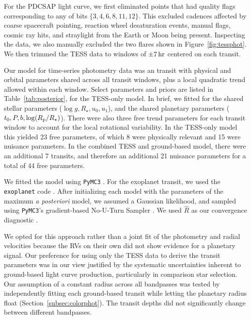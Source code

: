 \documentclass[12pt,twocolumn,tighten]{aastex63}
\begin{document}
For the PDCSAP light curve, we first eliminated points that had
quality flags corresponding to any of bits $\{3, 4, 6, 8, 11, 12\}$.
This excluded cadences affected by coarse spacecraft pointing,
reaction wheel desaturation events, manual flags, cosmic ray hits, and
straylight from the Earth or Moon being present.  Inspecting the data,
we also manually excluded the two flares shown in
Figure~\ref{fig:tessphot}.  We then trimmed the TESS data to windows
of $\pm 7\,{\rm hr}$ centered on each transit.

Our model for time-series photometry data was an
\citet{exoplanet:agol19} transit with physical and orbital parameters
shared across all transit windows, plus a local quadratic trend
allowed within each window.  Select parameters and priors are listed
in Table~\ref{tab:posterior}, for the TESS-only model.  In brief, we
fitted for the shared stellar parameters ($\log g, R_\star, u_0,
u_1$), and the shared planetary parameters ($t_0, P, b, \log(R_{\rm
p}/R_\star)$).  There were also three free trend parameters for each
transit window to account for the local rotational variability.  In
the TESS-only model this yielded 23 free parameters, of which 8 were
physically relevant and 15 were nuisance parameters.  In the combined
TESS and ground-based model, there were an additional 7 transits, and
therefore an additional 21 nuisance parameters for a total of 44 free
parameters.

We fitted the model using \texttt{PyMC3}
\citep{salvatier_2016_PyMC3,exoplanet:theano}.  For the exoplanet
transit, we used the \texttt{exoplanet} code
\citep{exoplanet:exoplanet}.  After initializing each model with the
parameters of the maximum {\it a posteriori} model, we assumed a
Gaussian likelihood, and sampled using \texttt{PyMC3}'s gradient-based
No-U-Turn Sampler \citep{hoffman_no-u-turn_2014}. We used $\hat{R}$ as
our convergence diagnostic \citep{gelman_inference_1992}.

We opted for this approach rather than a joint fit of the photometry
and radial velocities because the RVs on their own did not show
evidence for a planetary signal.  Our preference for using only the
TESS data to derive the transit parameters was in our view justified
by the systematic uncertainties inherent to ground-based light curve
production, particularly in comparison star selection.  Our assumption
of a constant radius across all bandpasses was tested by independently
fitting each ground-based transit while letting the planetary radius
float (Section~\ref{subsec:colorphot}). The transit depths did not
significantly change between different bandpasses.
\end{document}
